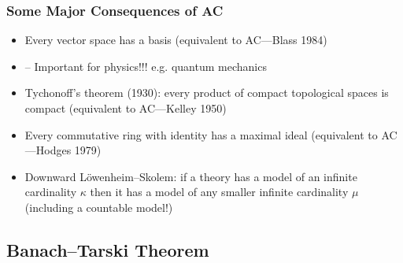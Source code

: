 \begin{frame}
\frametitle{Some Major Consequences of AC}

\begin{itemize}[<+->]

\item Every vector space has a basis (equivalent to AC---Blass 1984)
\item[] -- Important for physics!!! e.g. quantum mechanics

\item Tychonoff's theorem (1930): every product of compact topological spaces is compact (equivalent to AC---Kelley 1950)

\item Every commutative ring with identity has a maximal ideal (equivalent to AC---Hodges 1979)

\item Downward L\"owenheim--Skolem: if a theory has a model of an infinite cardinality $\kappa$ then it has a model of any smaller infinite cardinality $\mu$ (including a countable model!)

\end{itemize}
\end{frame}

\subsection{Banach--Tarski Theorem}

